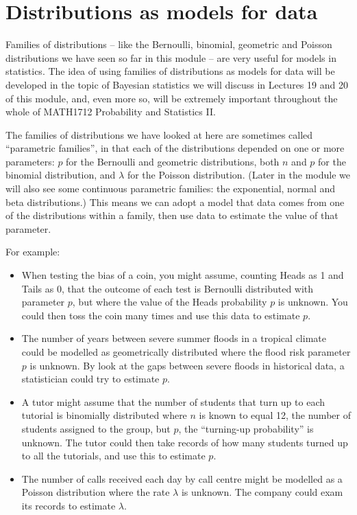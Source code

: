 \documentclass[
  a4paper,
]{book}
\theoremstyle{definition}
\theoremstyle{definition}
\theoremstyle{definition}
\theoremstyle{definition}
\theoremstyle{remark}
\begin{document}
\hypertarget{models}{%
\section{Distributions as models for data}\label{models}}

Families of distributions -- like the Bernoulli, binomial, geometric and Poisson distributions we have seen so far in this module -- are very useful for models in statistics. The idea of using families of distributions as models for data will be developed in the topic of Bayesian statistics we will discuss in Lectures 19 and 20 of this module, and, even more so, will be extremely important throughout the whole of MATH1712 Probability and Statistics II.

The families of distributions we have looked at here are sometimes called ``parametric families'', in that each of the distributions depended on one or more parameters: \(p\) for the Bernoulli and geometric distributions, both \(n\) and \(p\) for the binomial distribution, and \(\lambda\) for the Poisson distribution. (Later in the module we will also see some continuous parametric families: the exponential, normal and beta distributions.) This means we can adopt a model that data comes from one of the distributions within a family, then use data to estimate the value of that parameter.

For example:

\begin{itemize}
\item
  When testing the bias of a coin, you might assume, counting Heads as 1 and Tails as 0, that the outcome of each test is Bernoulli distributed with parameter \(p\), but where the value of the Heads probability \(p\) is unknown. You could then toss the coin many times and use this data to estimate \(p\).
\item
  The number of years between severe summer floods in a tropical climate could be modelled as geometrically distributed where the flood risk parameter \(p\) is unknown. By look at the gaps between severe floods in historical data, a statistician could try to estimate \(p\).
\item
  A tutor might assume that the number of students that turn up to each tutorial is binomially distributed where \(n\) is known to equal 12, the number of students assigned to the group, but \(p\), the ``turning-up probability'' is unknown. The tutor could then take records of how many students turned up to all the tutorials, and use this to estimate \(p\).
\item
  The number of calls received each day by call centre might be modelled as a Poisson distribution where the rate \(\lambda\) is unknown. The company could exam its records to estimate \(\lambda\).
\end{itemize}
\end{document}
